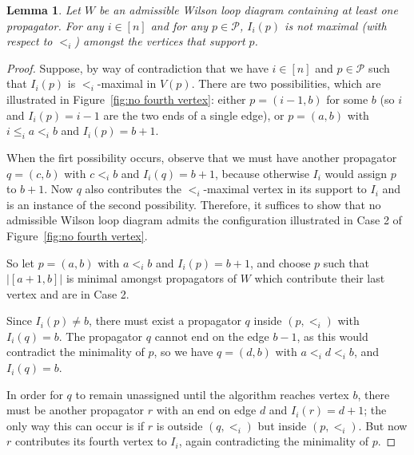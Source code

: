 \documentclass[11pt]{article}
\newcommand{\cP}{\mathcal{P}}
\newtheorem{lem}[thm]{Lemma}
\theoremstyle{remark}
\theoremstyle{definition}
\begin{document}
\begin{lem}\label{lem no fourth vertex}
Let $W$ be an admissible Wilson loop diagram containing at least one propagator. For any $i \in [n]$ and for any $p \in \cP$, $I_i(p)$ is not maximal (with respect to $<_i$) amongst the vertices that support $p$.
\end{lem} 
\begin{proof}
Suppose, by way of contradiction that we have $i \in [n]$ and $p \in \cP$ such that $I_i(p)$ is $<_i$-maximal in $V(p)$. There are two possibilities, which are illustrated in Figure~\ref{fig:no fourth vertex}: either $p = (i-1,b)$ for some $b$ (so $i$ and $I_i(p) = i-1$ are the two ends of a single edge), or $p = (a,b)$ with $i\leq_i a <_i b$ and $I_i(p) = b+1$. 

When the firt possibility occurs, observe that we must have another propagator $q = (c,b)$ with $c<_i b$ and $I_i(q) = b+1$, because otherwise $I_i$ would assign $p$ to $b+1$. Now $q$ also contributes the $<_i$-maximal vertex in its support to $I_i$ and is an instance of the second possibility. Therefore, it suffices to show that no admissible Wilson loop diagram admits the configuration illustrated in Case 2 of Figure~\ref{fig:no fourth vertex}. 

So let $p = (a,b)$ with $a<_ib$ and $I_i(p) = b+1$, and choose $p$ such that $\big|[a+1,b]\big|$ is minimal amongst propagators of $W$ which contribute their last vertex and are in Case 2.

Since $I_i(p) \neq b$, there must exist a propagator $q$ inside $(p,<_i)$ with $I_i(q) = b$. The propagator $q$ cannot end on the edge $b-1$, as this would contradict the minimality of $p$, so we have $q = (d,b)$ with $a <_i d <_i b$, and $I_i(q) = b$. 

In order for $q$ to remain unassigned until the algorithm reaches vertex $b$, there must be another propagator $r$ with an end on edge $d$ and $I_i(r) = d+1$; the only way this can occur is if $r$ is outside $(q,<_i)$ but inside $(p,<_i)$. But now $r$ contributes its fourth vertex to $I_i$, again contradicting the minimality of $p$.
\end{proof}
\end{document}
